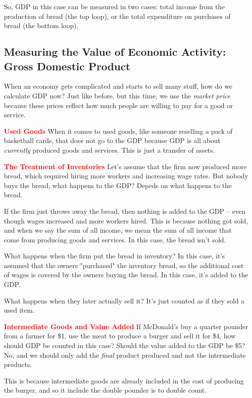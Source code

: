 \documentclass[12pt]{article}
\newcommand{\leadwords}[2]{\textcolor{red}{\textbf{\large #1}} #2}
\begin{document}
So, GDP in this case can be measured in two cases: total income from the production of bread (the top loop), or the total expenditure on purchases of bread (the bottom loop).


\subsection{Measuring the Value of Economic Activity: Gross Domestic Product}


When an economy gets complicated and starts to sell many stuff, how do we calculate GDP now? Just like before, but this time, we use the \textit{market price} because these prices reflect how much people are willing to pay for a good or service.



\leadwords{Used Goods} When it comes to used goods, like someone reselling a pack of basketball cards, that does not go to the GDP because GDP is all about \textit{currently} produced goods and services. This is just a transfer of assets.


\leadwords{The Treatment of Inventories} Let's assume that the firm now produced more bread, which required hiring more workers and increasing wage rates. But nobody buys the bread, what happens to the GDP? Depeds on what happens to the bread.

If the firm just throws away the bread, then nothing is added to the GDP -- even though wages increased and more workers hired. This is because nothing got sold, and when we say the sum of all income, we mean the sum of all income that come from producing goods and services. In this case, the bread isn't sold.

What happens when the firm put the bread in inventory? In this case, it's assumed that the owners "purchased" the inventory bread, so the additional cost of wages is covered by the owners buying the bread. In this case, it's added to the GDP.

What happens when they later actually sell it? It's just counted as if they sold a used item.

\leadwords{Intermediate Goods and Value Added} If McDonald's buy a quarter pounder from a farmer for \$1, use the meat to produce a burger and sell it for \$4, how should GDP be counted in this case? Should the value added to the GDP be \$5? No, and we should only add the \textit{final} product produced and not the intermediate products.

This is because intermediate goods are already included in the cost of producing the burger, and so it include the double pounder is to double count.
\end{document}
